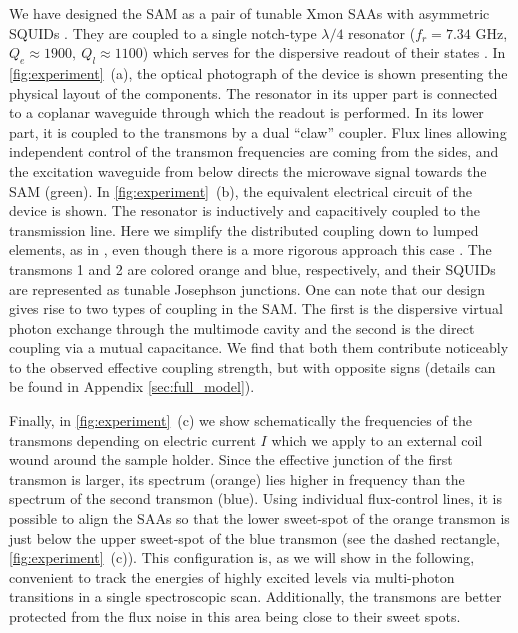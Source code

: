 \documentclass[%
 aps, prx,
 amsmath,amssymb,
 reprint,%
superscriptaddress
]{revtex4-2}
\begin{document}
We have designed the SAM as a pair of tunable Xmon SAAs with asymmetric 
SQUIDs \cite{hutchings2017tunable, koch2007charge, barends2013coherent}. They are coupled 
to a single notch-type \cite{probst2015efficient} 
$\lambda/4$ resonator ($f_r = 7.34$ GHz, $Q_e \approx 1900,\ Q_l \approx 1100$) which 
serves for the dispersive readout of their states \cite{chow2010detecting}. In \autoref{fig:experiment}~(a), 
the optical photograph of the device is shown presenting the physical layout of the components. The 
resonator in its upper part is connected to a 
coplanar waveguide through which the readout is 
performed. In its lower part, it is coupled to 
the transmons by a dual 
``claw'' \cite{barends2013coherent} coupler. Flux 
lines allowing independent control of the 
transmon frequencies are coming from the sides, and the excitation waveguide from 
below directs the microwave signal towards the SAM (green). 
In \autoref{fig:experiment}~(b), the equivalent 
electrical circuit of the device is shown. The 
resonator is inductively and capacitively coupled to the transmission line. Here we simplify the distributed coupling down to lumped elements, as in \cite{khalil2012analysis}, even though there is a more rigorous approach this case \cite{besedin2018quality}. The transmons 1 and 2 are colored orange and blue, respectively, and their SQUIDs are 
represented as tunable Josephson junctions. One can note that our design gives rise to two types of coupling in the SAM. The first is the dispersive virtual photon exchange through the multimode cavity\cite{majer2007coupling, filipp2011multimode} and the second is the direct coupling via a mutual capacitance. We find that both them contribute noticeably to the observed effective coupling strength, but with opposite signs (details can be found in Appendix \ref{sec:full_model}).

Finally, in 
\autoref{fig:experiment}~(c) we show 
schematically the frequencies of the transmons 
depending on electric current $I$ which we apply 
to an external coil wound around the sample 
holder. Since the effective junction of the first 
transmon is larger, its spectrum (orange) lies 
higher in frequency than the spectrum of the 
second transmon (blue). Using individual 
flux-control lines, it is possible to align the 
SAAs so that the lower sweet-spot of the orange 
transmon is just below the upper sweet-spot of 
the blue transmon (see the dashed rectangle,  
\autoref{fig:experiment}~(c)). This configuration 
is, as we will show in the following, convenient 
to track the energies of highly excited levels 
via multi-photon transitions in a single 
spectroscopic scan. Additionally, the transmons 
are better protected from the flux noise in this 
area being close to their sweet spots.
\end{document}
